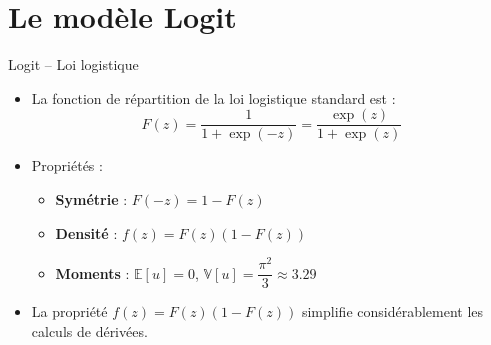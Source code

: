\documentclass[11pt,aspectratio=169]{beamer}
\newcommand{\E}{\mathbb{E}}
\newcommand{\V}{\mathbb{V}}
\begin{document}
\section{Le modèle Logit}

\begin{frame}{Logit -- Loi logistique}

\begin{itemize}

\item La fonction de répartition de la loi logistique standard est :
  \[
  F(z) = \frac{1}{1 + \exp(-z)} = \frac{\exp(z)}{1 + \exp(z)}
  \]

\item Propriétés :
  \begin{itemize}
  \item \textbf{Symétrie} : $F(-z) = 1 - F(z)$\newline
  \item \textbf{Densité} : $f(z) = F(z)(1 - F(z))$\newline
  \item \textbf{Moments} : $\E[u] = 0$, $\V[u] = \dfrac{\pi^2}{3} \approx 3.29$
  \end{itemize}

\item La propriété $f(z) = F(z)(1-F(z))$ simplifie considérablement les
  calculs de dérivées.

\end{itemize}

\end{frame}
\end{document}
